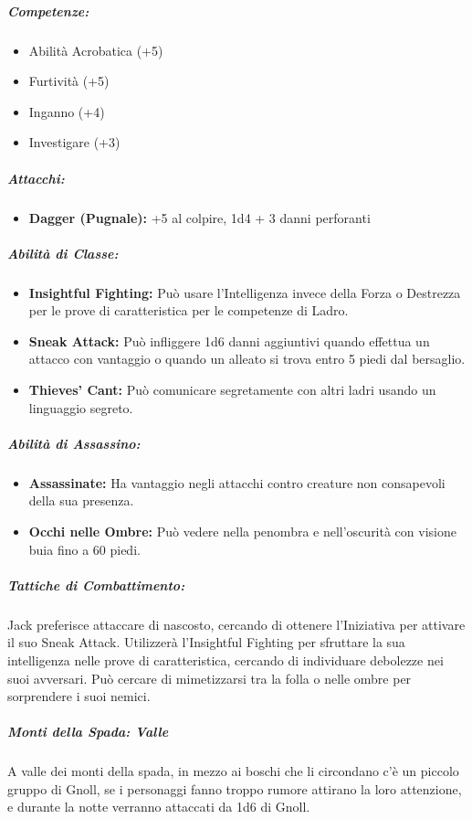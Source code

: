 \documentclass{article}
\begin{document}
\subparagraph*{Competenze:}
\begin{itemize}
  \item Abilità Acrobatica (+5)
  \item Furtività (+5)
  \item Inganno (+4)
  \item Investigare (+3)
\end{itemize}

\subparagraph*{Attacchi:}
\begin{itemize}
  \item \textbf{Dagger (Pugnale):} +5 al colpire, 1d4 + 3 danni perforanti
\end{itemize}

\subparagraph*{Abilità di Classe:}
\begin{itemize}
  \item \textbf{Insightful Fighting:} Può usare l'Intelligenza invece della Forza o Destrezza per le prove di caratteristica per le competenze di Ladro.
  \item \textbf{Sneak Attack:} Può infliggere 1d6 danni aggiuntivi quando effettua un attacco con vantaggio o quando un alleato si trova entro 5 piedi dal bersaglio.
  \item \textbf{Thieves' Cant:} Può comunicare segretamente con altri ladri usando un linguaggio segreto.
\end{itemize}

\subparagraph*{Abilità di Assassino:}
\begin{itemize}
  \item \textbf{Assassinate:} Ha vantaggio negli attacchi contro creature non consapevoli della sua presenza.
  \item \textbf{Occhi nelle Ombre:} Può vedere nella penombra e nell'oscurità con visione buia fino a 60 piedi.
\end{itemize}

\subparagraph*{Tattiche di Combattimento:}
Jack preferisce attaccare di nascosto, cercando di ottenere l'Iniziativa per attivare il suo Sneak Attack. Utilizzerà l'Insightful Fighting per sfruttare la sua intelligenza nelle prove di caratteristica, cercando di individuare debolezze nei suoi avversari. Può cercare di mimetizzarsi tra la folla o nelle ombre per sorprendere i suoi nemici.

\subparagraph{Monti della Spada: Valle}
A valle dei monti della spada, in mezzo ai boschi che li circondano c'è un piccolo gruppo di Gnoll, se i personaggi fanno troppo rumore attirano la loro attenzione, e durante la notte verranno attaccati da 1d6 di Gnoll. 
\end{document}
